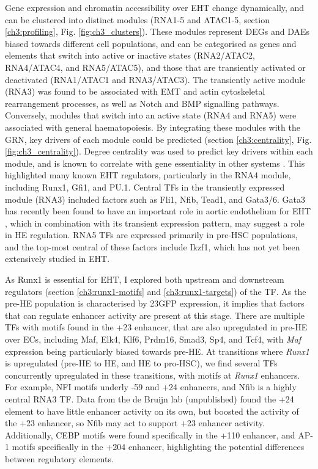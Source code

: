 Gene expression and chromatin accessibility over EHT change dynamically, and can be clustered into distinct modules (RNA1-5 and ATAC1-5, section \ref{ch3:profiling}, Fig. \ref{fig:ch3_clusters}). These modules represent DEGs and DAEs biased towards different cell populations, and can be categorised as genes and elements that switch into active or inactive states (RNA2/ATAC2, RNA4/ATAC4, and RNA5/ATAC5), and those that are transiently activated or deactivated (RNA1/ATAC1 and RNA3/ATAC3). The transiently active module (RNA3) was found to be associated with EMT and actin cytoskeletal rearrangement processes, as well as Notch and BMP signalling pathways. Conversely, modules that switch into an active state (RNA4 and RNA5) were associated with general haematopoiesis. By integrating these modules with the GRN, key drivers of each module could be predicted (section \ref{ch3:centrality}, Fig. \ref{fig:ch3_centrality}). Degree centrality was used to predict key drivers within each module, and is known to correlate with gene essentiality in other systems \citep{hahn_comparative_2005, jeong_lethality_2001, koschutzki_centrality_2008}. This highlighted many known EHT regulators, particularly in the RNA4 module, including Runx1, Gfi1, and PU.1. Central TFs in the transiently expressed module (RNA3) included factors such as Fli1, Nfib, Tead1, and Gata3/6. Gata3 has recently been found to have an important role in aortic endothelium for EHT \citep{zaidan_endothelial-specific_2022}, which in combination with its transient expression pattern, may suggest a role in HE regulation. RNA5 TFs are expressed primarily in pre-HSC populations, and the top-most central of these factors include Ikzf1, which has not yet been extensively studied in EHT.

As Runx1 is essential for EHT, I explored both upstream and downstream regulators (section \ref{ch3:runx1-motifs} and \ref{ch3:runx1-targets}) of the TF. As the pre-HE population is characterised by 23GFP expression, it implies that factors that can regulate enhancer activity are present at this stage. There are multiple TFs with motifs found in the +23 enhancer, that are also upregulated in pre-HE over ECs, including Maf, Elk4, Klf6, Prdm16, Smad3, Sp4, and Tcf4, with \textit{Maf} expression being particularly biased towards pre-HE. At transitions where \textit{Runx1} is upregulated (pre-HE to HE, and HE to pro-HSC), we find several TFs concurrently upregulated in these transitions, with motifs at \textit{Runx1} enhancers. For example, NFI motifs underly -59 and +24 enhancers, and Nfib is a highly central RNA3 TF. Data from the de Bruijn lab (unpublished) found the +24 element to have little enhancer activity on its own, but boosted the activity of the +23 enhancer, so Nfib may act to support +23 enhancer activity. Additionally, CEBP motifs were found specifically in the +110 enhancer, and AP-1 motifs specifically in the +204 enhancer, highlighting the potential differences between regulatory elements. 


